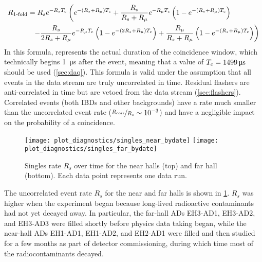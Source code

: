 \begin{align}
    \label{eq:rsingles}
    \begin{split}
        R_{\text{\fold{1}}}
          &= R_s e^{-R_s\tc}
          \left(
              e^{-(R_s + R_\mu)\tc} +
              \frac{R_s}{R_s+R_\mu} e^{-R_\mu\tc}
              \left(
                  1 - e^{-(R_s + R_\mu)\tc}
              \right)
          \right. \\
          &\ \ %
          \left. - \frac{R_s}{2R_s + R_\mu} e^{-R_\mu\tc}
              \left(
                  1 - e^{-(2R_s + R_\mu)\tc}
              \right) +
              \frac{R_\mu}{R_s + R_\mu}
              \left(
                  1 - e^{-(R_s + R_\mu)\tc}
              \right)
          \right)
    \end{split}
\end{align}
In this formula, \tc{} represents the actual duration of the coincidence window,
which technically begins \SI{1}{\micro\second} after the event,
meaning that a value of $T_c=\SI{1499}{\micro\second}$ should be used (\cref{sec:daq}).
This formula is valid under the assumption that all
events in the data stream are truly uncorrelated in time.
Residual flashers are anti-correlated in time
but are vetoed from the data stream (\cref{sec:flashers}).
Correlated events (both IBDs and other backgrounds)
have a rate much smaller than the uncorrelated event rate
($\nicefrac{R_{\text{corr}}}{R_s} \sim 10^{-3}$)
and have a negligible impact on the probability of a  coincidence.

\begin{figure}
    \texttt{[image: plot\_diagnostics/singles\_near\_bydate]}
    \texttt{[image: plot\_diagnostics/singles\_far\_bydate]}
    \caption{
        Singles rate $R_s$ over time for
        the near halls (top) and far hall (bottom).
        Each data point represents one data run.
    }
    \label{fig:singles}
\end{figure}

The uncorrelated event rate $R_s$ for the near and far halls is shown in
\cref{fig:singles}.
$R_s$ was higher when the experiment began because long-lived
radioactive contaminants had not yet decayed away.
In particular, the far-hall ADs EH3-AD1, EH3-AD2, and EH3-AD3
were filled shortly before physics data taking began,
while the near-hall ADs EH1-AD1, EH1-AD2, and EH2-AD1
were filled and then studied for a few months
as part of detector commissioning, during which time
most of the radiocontaminants decayed.

